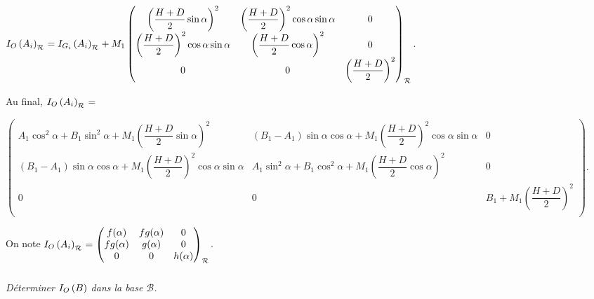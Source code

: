\documentclass[10pt,fleqn]{article} %
\begin{document}
\begin{multicols}{2}
\begin{corrige}
 
  $\inertie{O}{A_i}_{\rep{}}=\inertie{G_i}{A_i}_{\rep{}}+M_1\begin{pmatrix}
\left( \dfrac{H+D}{2} \sin \alpha \right)^2 &\left( \dfrac{H+D}{2} \right) ^2 \cos \alpha \sin \alpha  & 0 \\ 
\left( \dfrac{H+D}{2} \right) ^2 \cos \alpha \sin \alpha  & \left( \dfrac{H+D}{2} \cos \alpha \right)^2& 0 \\
 0 & 0 &\left( \dfrac{H+D}{2}\right)^2 \\\end{pmatrix}_{\rep{}}$.
 

Au final, 
$
\inertie{O}{A_i}_{\rep{}}=$

$
\begin{pmatrix}
A_1 \cos^2\alpha +B_1 \sin^2\alpha + M_1\left( \dfrac{H+D}{2} \sin \alpha \right)^2 
& \left( B_1-A_1\right) \sin\alpha\cos\alpha +M_1\left( \dfrac{H+D}{2} \right) ^2 \cos \alpha \sin \alpha 
& 0 \\ 
\left( B_1-A_1\right) \sin\alpha\cos\alpha +M_1 \left( \dfrac{H+D}{2} \right) ^2 \cos \alpha \sin \alpha 
&A_1\sin^2\alpha+ B_1\cos^2 \alpha +M_1\left( \dfrac{H+D}{2} \cos \alpha \right)^2
& 0 \\ 
0 & 0 & B_1+M_1\left( \dfrac{H+D}{2}\right)^2 \\ \end{pmatrix}
$.

On note 
$\inertie{O}{A_i}_{\rep{}}=\matinertie{f(\alpha)}{g(\alpha)}{h(\alpha)}{0}{0}{fg(\alpha)}{\rep{}}$.

 

% 
% 
\end{corrige}
\else
\fi

\subparagraph{}
\textit{Déterminer $\inertie{O}{B}$  dans la base $\mathcal{B}$.}




\end{multicols}
\end{document}
